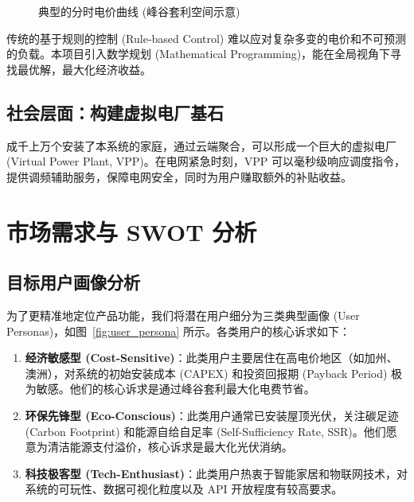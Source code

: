 \begin{figure}[htbp]
    \centering
    \caption{典型的分时电价曲线 (峰谷套利空间示意)}
    \label{fig:tou_price}
\end{figure}

传统的基于规则的控制 (Rule-based Control) 难以应对复杂多变的电价和不可预测的负载。本项目引入数学规划 (Mathematical Programming)，能在全局视角下寻找最优解，最大化经济收益。

\subsection{社会层面：构建虚拟电厂基石}
成千上万个安装了本系统的家庭，通过云端聚合，可以形成一个巨大的虚拟电厂 (Virtual Power Plant, VPP)。在电网紧急时刻，VPP 可以毫秒级响应调度指令，提供调频辅助服务，保障电网安全，同时为用户赚取额外的补贴收益。

\section{市场需求与 SWOT 分析}

\subsection{目标用户画像分析}

为了更精准地定位产品功能，我们将潜在用户细分为三类典型画像 (User Personas)，如图~\ref{fig:user_persona} 所示。各类用户的核心诉求如下：

\begin{enumerate}
    \item \textbf{经济敏感型 (Cost-Sensitive)}：此类用户主要居住在高电价地区（如加州、澳洲），对系统的初始安装成本 (CAPEX) 和投资回报期 (Payback Period) 极为敏感。他们的核心诉求是通过峰谷套利最大化电费节省。
    \item \textbf{环保先锋型 (Eco-Conscious)}：此类用户通常已安装屋顶光伏，关注碳足迹 (Carbon Footprint) 和能源自给自足率 (Self-Sufficiency Rate, SSR)。他们愿意为清洁能源支付溢价，核心诉求是最大化光伏消纳。
    \item \textbf{科技极客型 (Tech-Enthusiast)}：此类用户热衷于智能家居和物联网技术，对系统的可玩性、数据可视化粒度以及 API 开放程度有较高要求。
\end{enumerate}

